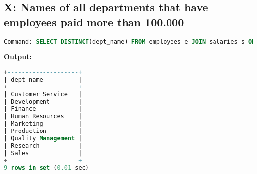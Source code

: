 \documentclass[12pt]{report}
\begin{document}
\subsection*{X: Names of all departments that have employees paid more
than 100.000}

\begin{lstlisting}[language=sql]
Command: SELECT DISTINCT(dept_name) FROM employees e JOIN salaries s ON e.emp_no=s.emp_no JOIN dept_emp de ON de.emp_no=e.emp_no JOIN departments d ON d.dept_no=de.dept_no WHERE s.salary>100000;
\end{lstlisting}
\textbf{Output:}
\begin{lstlisting}[language=sql]
+--------------------+
| dept_name          |
+--------------------+
| Customer Service   |
| Development        |
| Finance            |
| Human Resources    |
| Marketing          |
| Production         |
| Quality Management |
| Research           |
| Sales              |
+--------------------+
9 rows in set (0.01 sec)

\end{lstlisting}
\end{document}
